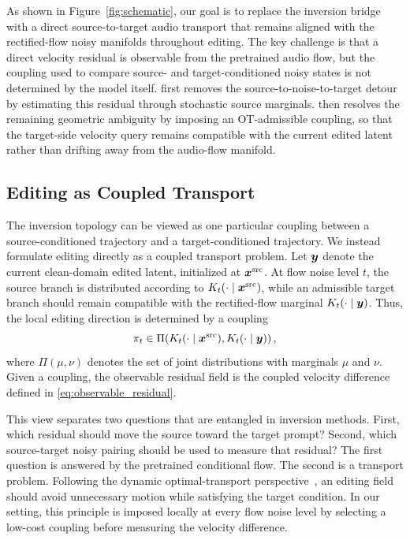 As shown in Figure~\ref{fig:schematic}, our goal is to replace the inversion bridge with a direct source-to-target audio transport that remains aligned with the rectified-flow noisy manifolds throughout editing.
The key challenge is that a direct velocity residual is observable from the pretrained audio flow, but the coupling used to compare source- and target-conditioned noisy states is not determined by the model itself.
\method first removes the source-to-noise-to-target detour by estimating this residual through stochastic source marginals.
\methodplus then resolves the remaining geometric ambiguity by imposing an OT-admissible coupling, so that the target-side velocity query remains compatible with the current edited latent rather than drifting away from the audio-flow manifold.

\subsection{Editing as Coupled Transport}

The inversion topology can be viewed as one particular coupling between a source-conditioned trajectory and a target-conditioned trajectory.
We instead formulate editing directly as a coupled transport problem.
Let $\boldsymbol{y}$ denote the current clean-domain edited latent, initialized at $\boldsymbol{x}^{\mathrm{src}}$.
At flow noise level $t$, the source branch is distributed according to $K_t(\cdot\mid \boldsymbol{x}^{\mathrm{src}})$, while an admissible target branch should remain compatible with the rectified-flow marginal $K_t(\cdot\mid \boldsymbol{y})$.
Thus, the local editing direction is determined by a coupling
\begin{equation}
    \pi_t\in
    \Pi\!\left(
    K_t(\cdot\mid \boldsymbol{x}^{\mathrm{src}}),
    K_t(\cdot\mid \boldsymbol{y})
    \right),
\end{equation}
where $\Pi(\mu,\nu)$ denotes the set of joint distributions with marginals $\mu$ and $\nu$.
Given a coupling, the observable residual field is the coupled velocity difference defined in \eqref{eq:observable_residual}.

This view separates two questions that are entangled in inversion methods.
First, which residual should move the source toward the target prompt?
Second, which source-target noisy pairing should be used to measure that residual?
The first question is answered by the pretrained conditional flow.
The second is a transport problem.
Following the dynamic optimal-transport perspective~\cite{benamou2000computational,peyre2019computational}, an editing field should avoid unnecessary motion while satisfying the target condition.
In our setting, this principle is imposed locally at every flow noise level by selecting a low-cost coupling before measuring the velocity difference.

